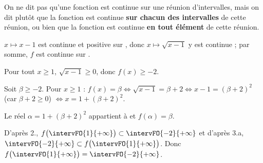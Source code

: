 \begin{remark}
On ne dit pas qu'une fonction est continue sur une réunion d'intervalles, mais on dit plutôt que la fonction est continue \textbf{sur chacun des intervalles} de cette réunion, ou bien que la fonction est continue \textbf{en tout élément} de cette réunion.
\end{remark}
\fi %
\begin{corrigeprof}[10]
\be
\item $x\longmapsto x-1$ est continue et positive sur , donc $x\longmapsto\sqrt{x-1}$ y est continue ; par somme, $f$ est continue sur .
\item Pour tout $x\geq 1$, $\sqrt{x-1}\geq 0$, donc $f(x)\geq -2$.
\item \be \item Soit $\beta\geq -2$. Pour $x\geq 1$ : $f(x)=\beta\iff\sqrt{x-1}=\beta+2\iff x-1=(\beta+2)^2$ (car $\beta+2\geq 0$) $\iff x=1+(\beta+2)^2$.
	\par Le réel $\alpha=1+(\beta+2)^2$ appartient à  et $f(\alpha)=\beta$.
	\item D'après 2., $f\big(\intervFO{1}{+\infty}\big)\subset\intervFO{-2}{+\infty}$ et d'après 3.a, $\intervFO{-2}{+\infty}\subset f\big(\intervFO{1}{+\infty}\big)$. Donc $f\big(\intervFO{1}{+\infty}\big)=\intervFO{-2}{+\infty}$.\ee
\ee
\end{corrigeprof}
\ifenseignant %

